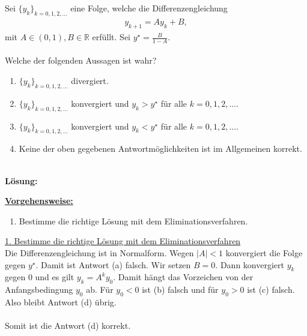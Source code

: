 \subsection*{}
Sei $ \{y_k\}_{k=0,1,2,...} $ eine Folge, welche die Differenzengleichung
\begin{align*}
	y_{k+1} = A y_k + B,
\end{align*}
mit $ A \in (0,1), B\in \mathbb{R} $ erfüllt. Sei $ y^\star = \frac{B}{1-A} $.\\
\\
Welche der folgenden Aussagen ist wahr?
\renewcommand{\labelenumi}{(\alph{enumi})}
\begin{enumerate}
	\item 
	$ \{y_k\}_{k=0,1,2,...}$ divergiert.
	\item
	$ \{y_k\}_{k=0,1,2,...}$ konvergiert und $ y_k > y^\star  $ für alle $ k = 0,1,2,... $.
	
	\item
	$ \{y_k\}_{k=0,1,2,...}$ konvergiert und $ y_k <y^\star  $ für alle $ k = 0,1,2,... $.
	\item
	Keine der oben gegebenen Antwortmöglichkeiten ist im Allgemeinen korrekt.
	
\end{enumerate}
\ \\
\textbf{Lösung:}
\begin{mdframed}
	\underline{\textbf{Vorgehensweise:}}
	\renewcommand{\labelenumi}{\theenumi.}
	\begin{enumerate}
		\item Bestimme die richtige Lösung mit dem Eliminationsverfahren. 
	\end{enumerate}
\end{mdframed}

\underline{1. Bestimme die richtige Lösung mit dem Eliminationsverfahren}\\
Die Differenzengleichung ist in Normalform.
Wegen $ |A| < 1 $ konvergiert die Folge gegen $ y^\star $.
Damit ist Antwort (a) falsch.
Wir setzen $ B = 0 $. Dann konvergiert $ y_k $ gegen $ 0 $ und es gilt $ y_k = A^k y_0 $.
Damit hängt das Vorzeichen von der Anfangsbedingung $ y_0 $ ab.
Für $ y_0 < 0  $ ist (b) falsch und für $ y_0 > 0 $ ist (c) falsch.
Also bleibt Antwort (d) übrig.\\
\\
Somit ist die Antwort (d) korrekt.
